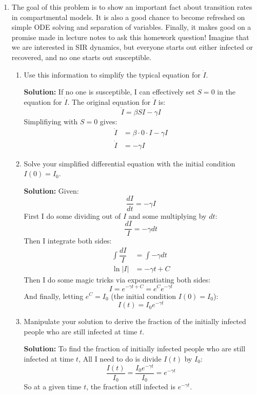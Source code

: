 \documentclass[11pt]{article}
\newenvironment{solution}{\par\noindent\begingroup\color{BrickRed}\textbf{Solution:} }{\par\endgroup}
\begin{document}
\begin{enumerate}
\clearpage

\item The goal of this problem is to show an important fact about transition rates in compartmental models.
	  It is also a good chance to become refreshed on simple ODE solving and separation of variables.
	  Finally, it makes good on a promise made in lecture notes to ask this homework question!
	  Imagine that we are interested in SIR dynamics,
	  but everyone starts out either infected or recovered,
	  and no one starts out susceptible.
\begin{enumerate}[label=\alph*.]
	\item Use this information to simplify the typical equation for $\dot{I}$.
		\begin{solution} \newline
		If no one is susceptible, I can effectively set $S=0$ in the equation for $\dot{I}$.
		The original equation for $\dot{I}$ is: 
		$$\dot{I} = \beta S I - \gamma I$$
		Simplifiying with $S=0$ gives:
			\begin{align*}
			\dot{I} &= \beta \cdot 0 \cdot I - \gamma I \\
			\dot{I} &= - \gamma I
			\end{align*}
		\end{solution}

	\item Solve your simplified differential equation with the initial condition $I(0) = I_0$.
		\begin{solution} \newline
			Given:
			$$\dfrac{dI}{dt} = -\gamma I$$
			First I do some dividing out of $I$ and some multiplying by $dt$:
			$$\dfrac{dI}{I} = -\gamma dt$$
			Then I integrate both sides:
			\begin{align*}
			\int \dfrac{dI}{I} &= \int -\gamma dt \\
			\ln|I| &= -\gamma t + C
			\end{align*}
			Then I do some magic tricks via exponentiating both sides:
			$$I = e^{-\gamma t + C} = e^C e^{-\gamma t}$$
			And finally, letting $e^C = I_0$ (the initial condition $I(0) = I_0$):
			$$I(t) = I_0 e^{-\gamma t}$$
		\end{solution}

	\item Manipulate your solution to derive the fraction of the initially infected people who are still infected at time $t$.
		\begin{solution} \newline \newline
			To find the fraction of initially infected people who are still infected at time $t$,
			All I need to do is divide $I(t)$ by $I_0$:
			$$\frac{I(t)}{I_0} = \frac{I_0 e^{-\gamma t}}{I_0} = e^{-\gamma t}$$
			So at a given time $t$, the fraction still infected is $e^{-\gamma t}$.
		\end{solution}


\end{enumerate}
\end{enumerate}
\end{document}
